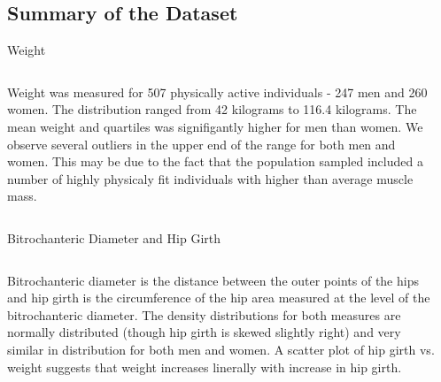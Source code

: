 \documentclass[table]{beamer}
\begin{document}

\subsection{Summary of the Dataset}


\begin{frame}{Weight}
     \begin{columns}[t] %
     \begin{column}[T]{5cm} %
   
{\fontsize{0.275cm}{1em}\selectfont 
Weight was measured for 507 physically active individuals - 247 men and 260 women. The distribution ranged from 42 kilograms to 116.4 kilograms. The mean weight and quartiles was signifigantly higher for men than women. We observe several outliers in the upper end of the range for both men and women. This may be due to the fact that the population sampled included a number of highly physicaly fit individuals with higher than average muscle mass.}


     \end{column}
     \begin{column}[T]{5cm} %


     \end{column}
     \end{columns}
\end{frame}


\begin{frame}{Bitrochanteric Diameter and Hip Girth}
     \begin{columns}[t] %
     \begin{column}[T]{5cm} %
   
{\fontsize{0.275cm}{1em}\selectfont 
Bitrochanteric diameter is the distance between the outer points of the hips and hip girth is the circumference of the hip area measured at the level of the bitrochanteric diameter. The density distributions for both measures are normally distributed (though hip girth is skewed slightly right) and very similar in distribution for both men and women. A scatter plot of hip girth vs. weight suggests that weight increases linerally with increase in hip girth.}

\end{column}
\begin{column}[T]{5cm} %



     \end{column}
     \end{columns}

\end{frame}
\end{document}
